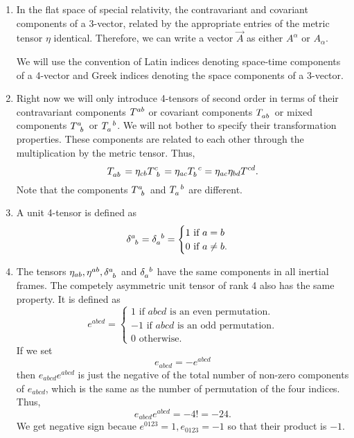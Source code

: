 \begin{enumerate}
\item In the flat space of special relativity, the contravariant and
covariant components of a 3-vector, related by the appropriate entries of the
metric tensor $\eta$ identical. Therefore, we can write a vector $\vec{A}$ as
either $A^\alpha$ or $A_\alpha$.

We will use the convention of Latin indices denoting space-time components of 
a 4-vector and Greek indices denoting the space components of a 3-vector.

\item Right now we will only introduce 4-tensors of second order in terms of 
their contravariant components $\tensor{T}{^{ab}}$ or covariant components 
$\tensor{T}{_{ab}}$ or mixed components $\tensor{T}{^a_b}$ or $\tensor{T}{_a^b}
$. We will not bother to specify their transformation properties. These 
components are related to each other through the multiplication by the metric
tensor. Thus, 
\begin{equation}\label{c1e50}
\tensor{T}{_{ab}} = \eta_{cb}\tensor{T}{^c_b} =
\eta_{ac}\tensor{T}{_b^c} = \eta_{ac}\eta_{bd}T^{cd}.
\end{equation}
Note that the components $\tensor{T}{^a_b}$ and $\tensor{T}{_a^b}$ are 
different.

\item A unit 4-tensor is defined as
\begin{equation}\label{c1e51}
\tensor{\delta}{^a_b} = \tensor{\delta}{_a^b} = \begin{cases}
1 \text{  if  } a = b \\
0 \text{  if  } a \ne b.
\end{cases}
\end{equation}

\item The tensors $\eta_{ab}, \eta^{ab}, \tensor{\delta}{^a_b}$ and 
$\tensor{\delta}{_a^b}$ have the same components in all inertial frames. The 
competely asymmetric unit tensor of rank 4 also has the same property. It is
defined as
\begin{equation}\label{c1e52}
e^{abcd} = \begin{cases}
1 \text{  if  } abcd \text{  is an even permutation.} \\
-1 \text{  if  } abcd \text{  is an odd permutation.} \\
0 \text {  otherwise.}
\end{cases}
\end{equation}
If we set
\begin{equation}\label{c1e53}
e_{abcd} = -e^{abcd}
\end{equation}
then $e_{abcd}e^{abcd}$ is just the negative of the total 
number of non-zero components of $e_{abcd}$, which is the same as the
number of permutation of the four indices. Thus,
\begin{equation}\label{c1e54}
e_{abcd}e^{abcd} = -4! = -24.
\end{equation}
We get negative sign becaue $e^{0123} = 1, e_{0123} = -1$ so that their product 
is $-1$.


\end{enumerate}
